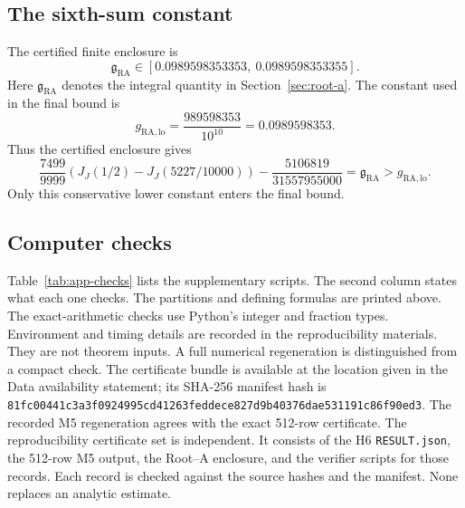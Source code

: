 \subsection{The sixth-sum constant}\label{subsec:app-roota}

The certified finite enclosure is
\begin{equation}\label{eq:app-roota-enclosure}
 \mathfrak g_{\mathrm{RA}}
 \in[0.0989598353353,\ 0.0989598353355].
\end{equation}
Here \(\mathfrak g_{\mathrm{RA}}\) denotes the integral quantity
in Section~\ref{sec:root-a}.
The constant used in the final bound is
\begin{equation}\label{eq:app-roota-floor}
 g_{\mathrm{RA,lo}}=
 \frac{989598353}{10^{10}}=0.0989598353.
\end{equation}
Thus the certified enclosure gives
\begin{equation}\label{eq:app-roota-comparison}
 \frac{7499}{9999}
 \left(J_J(1/2)-J_J(5227/10000)\right)
 -\frac{5106819}{31557955000}
 =\mathfrak g_{\mathrm{RA}}>g_{\mathrm{RA,lo}}.
\end{equation}
Only this conservative lower constant enters the final bound.

\subsection{Computer checks}\label{subsec:app-checks}

Table~\ref{tab:app-checks} lists the supplementary scripts.
The second column states what each one checks.
The partitions and defining formulas are printed above.
The exact-arithmetic checks use Python's integer and fraction types.
Environment and timing details are recorded in the reproducibility
materials. They are not theorem inputs.
A full numerical regeneration is distinguished from a compact check.
The certificate bundle is available at the location given in the
Data availability statement; its SHA-256 manifest hash is
\texttt{81fc00441c3a3f0924995cd41263feddece827d9b40376dae531191c86f90ed3}.
The recorded M5 regeneration agrees with the exact 512-row certificate.
The reproducibility certificate set is independent. It consists of the H6
\texttt{RESULT.json}, the 512-row M5 output, the Root--A enclosure, and the
verifier scripts for those records. Each record is checked against the source
hashes and the manifest. None replaces an analytic estimate.

